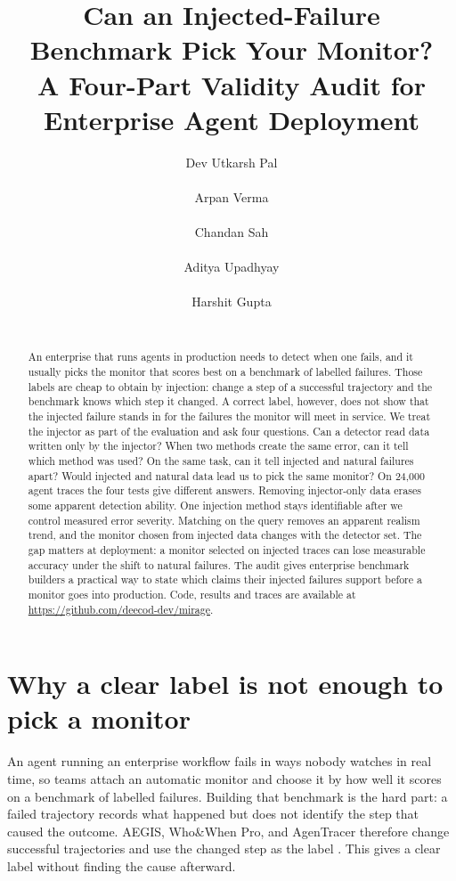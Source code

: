 \documentclass{article}
\title{Can an Injected-Failure Benchmark Pick Your Monitor?\\
A Four-Part Validity Audit for Enterprise Agent Deployment}
\author{%
  Dev Utkarsh Pal\\ \TODO{affiliation}\\ \texttt{\TODO{email}}
  \And
  Arpan Verma\\ \TODO{affiliation}\\ \texttt{\TODO{email}}
  \And
  Chandan Sah\\ \TODO{affiliation}\\ \texttt{\TODO{email}}
  \And
  Aditya Upadhyay\\ \TODO{affiliation}\\ \texttt{\TODO{email}}
  \And
  Harshit Gupta\\ \TODO{affiliation}\\ \texttt{\TODO{email}}
}
\begin{document}
\maketitle
\begin{abstract}
An enterprise that runs agents in production needs to detect when one fails, and it usually
picks the monitor that scores best on a benchmark of labelled failures. Those labels are cheap
to obtain by injection: change a step of a successful trajectory and the benchmark knows which
step it changed. A correct label, however, does not show that the injected failure stands in
for the failures the monitor will meet in service. We treat the injector as part of the
evaluation and ask four questions. Can a detector read data written only by the injector? When
two methods create the same error, can it tell which method was used? On the same task, can it
tell injected and natural failures apart? Would injected and natural data lead us to pick the
same monitor? On 24,000 agent traces the four tests give different answers. Removing
injector-only data erases some apparent detection ability. One injection method stays
identifiable after we control measured error severity. Matching on the query removes an
apparent realism trend, and the monitor chosen from injected data changes with the detector
set. The gap matters at deployment: a monitor selected on injected traces can lose measurable
accuracy under the shift to natural failures. The audit gives enterprise benchmark builders a
practical way to state which claims their injected failures support before a monitor goes into
production. Code, results and traces are available at
\url{https://github.com/deecod-dev/mirage}.
\end{abstract}

\section{Why a clear label is not enough to pick a monitor}
An agent running an enterprise workflow fails in ways nobody watches in real time, so teams attach an automatic monitor and choose it by how well it scores on a benchmark of labelled failures. Building that benchmark is the hard part: a failed trajectory records what happened but does not identify the step that caused the outcome. AEGIS, Who\&When Pro, and AgenTracer therefore change successful
trajectories and use the changed step as the label \citep{aegis,whenpro,agentracer}. This gives
a clear label without finding the cause afterward.
\end{document}
